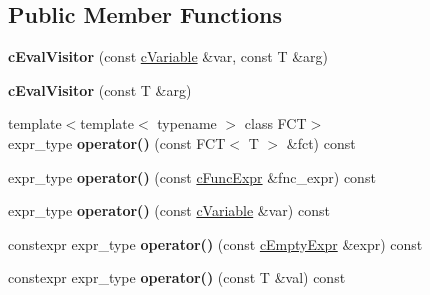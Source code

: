 \subsection*{Public Member Functions}
\begin{DoxyCompactItemize}
\item 
\hypertarget{classcEvalVisitor_a172f09cf67bb0e2829256bc434eefb93}{{\bfseries c\-Eval\-Visitor} (const \hyperlink{classcVariable}{c\-Variable} \&var, const T \&arg)}\label{classcEvalVisitor_a172f09cf67bb0e2829256bc434eefb93}

\item 
\hypertarget{classcEvalVisitor_a146122c4b6d13e1c7c11e599902d41b0}{{\bfseries c\-Eval\-Visitor} (const T \&arg)}\label{classcEvalVisitor_a146122c4b6d13e1c7c11e599902d41b0}

\item 
\hypertarget{classcEvalVisitor_a9d76055a29c87d00102043b793c143bf}{{\footnotesize template$<$template$<$ typename $>$ class F\-C\-T$>$ }\\expr\-\_\-type {\bfseries operator()} (const F\-C\-T$<$ T $>$ \&fct) const }\label{classcEvalVisitor_a9d76055a29c87d00102043b793c143bf}

\item 
\hypertarget{classcEvalVisitor_a8f8d0e67b7336925861d36b4a3b5cd00}{expr\-\_\-type {\bfseries operator()} (const \hyperlink{classcFuncExpr}{c\-Func\-Expr} \&fnc\-\_\-expr) const }\label{classcEvalVisitor_a8f8d0e67b7336925861d36b4a3b5cd00}

\item 
\hypertarget{classcEvalVisitor_ad10e7bbacd12a0052287160fb5cbd133}{expr\-\_\-type {\bfseries operator()} (const \hyperlink{classcVariable}{c\-Variable} \&var) const }\label{classcEvalVisitor_ad10e7bbacd12a0052287160fb5cbd133}

\item 
\hypertarget{classcEvalVisitor_afbd3267a9d10490164732fb819e6dbe9}{constexpr expr\-\_\-type {\bfseries operator()} (const \hyperlink{structcEmptyExpr}{c\-Empty\-Expr} \&expr) const }\label{classcEvalVisitor_afbd3267a9d10490164732fb819e6dbe9}

\item 
\hypertarget{classcEvalVisitor_a287e9f900e386ad2d36f161df7567adf}{constexpr expr\-\_\-type {\bfseries operator()} (const T \&val) const }\label{classcEvalVisitor_a287e9f900e386ad2d36f161df7567adf}

\end{DoxyCompactItemize}
